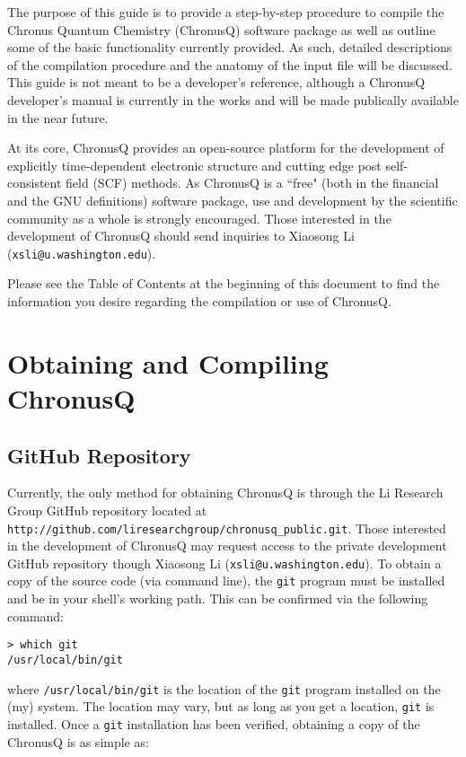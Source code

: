 \documentclass[12pt]{article}
\makeatletter
\newcommand{\ChronusQGitHubPUBLIC}{\texttt{http://github.com/liresearchgroup/chronusq\_public.git}}
\newcommand{\XiaosongContact}{Xiaosong Li (\texttt{xsli@u.washington.edu})}
\makeatother
\begin{document}
  The purpose of this guide is to provide a step-by-step procedure to compile the
  Chronus Quantum Chemistry (ChronusQ) software package as well as outline some
  of the basic functionality currently provided. As such, detailed descriptions
  of the compilation procedure and the anatomy of the input file will be discussed.
  This guide is not meant to be a developer's reference, although a ChronusQ developer's
  manual is currently in the works and will be made publically available in the near 
  future.

  At its core, ChronusQ provides an open-source platform for the development of explicitly
  time-dependent electronic structure and cutting edge post self-consistent field
  (SCF) methods. As ChronusQ is a ``free" (both in the financial and the GNU definitions)  
  software package, use and development by the scientific community as a whole is 
  strongly encouraged. Those interested in the development of ChronusQ should send 
  inquiries to \XiaosongContact.

  Please see the Table of Contents at the beginning of this document to find
  the information you desire regarding the compilation or use of ChronusQ.

  \section{Obtaining and Compiling ChronusQ} \label{sec:ObtainAndCompile}
    \subsection{GitHub Repository} \label{subsec:ChronusQGitHub}

    Currently, the only method for obtaining ChronusQ is through the Li Research
    Group GitHub repository located at \ChronusQGitHubPUBLIC. Those interested in
    the development of ChronusQ may request access to the private development GitHub
    repository though \XiaosongContact. To obtain a copy of the source code (via 
    command line), the \texttt{git} program must be installed and be in your shell's 
    working path. This can be confirmed via the following command:

    \begin{lstlisting}
> which git
/usr/local/bin/git
    \end{lstlisting}

    \noindent where \texttt{/usr/local/bin/git} is the location of the \texttt{git} 
    program installed on the (my) system. The location may vary, but as long as 
    you get a location, \texttt{git} is installed. Once a \texttt{git} 
    installation has been verified, obtaining a copy of the ChronusQ is as 
    simple as:
\end{document}

